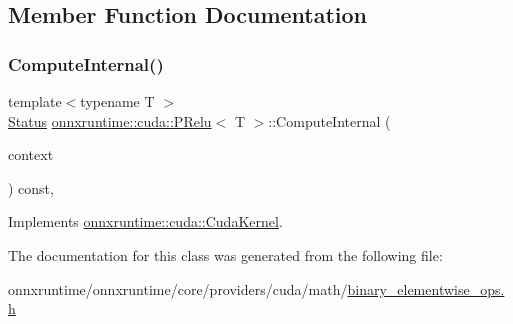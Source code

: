 \subsection{Member Function Documentation}
\mbox{\label{classonnxruntime_1_1cuda_1_1PRelu_ac22e96f904703a1dd13dc6748a67f2ae}} 
\subsubsection{\texorpdfstring{Compute\+Internal()}{ComputeInternal()}}
{\footnotesize\ttfamily template$<$typename T $>$ \\
\mbox{\hyperlink{classonnxruntime_1_1common_1_1Status}{Status}} \mbox{\hyperlink{classonnxruntime_1_1cuda_1_1PRelu}{onnxruntime\+::cuda\+::\+P\+Relu}}$<$ T $>$\+::Compute\+Internal (\begin{DoxyParamCaption}\item[{\mbox{\hyperlink{classonnxruntime_1_1OpKernelContext}{Op\+Kernel\+Context}} $\ast$}]{context }\end{DoxyParamCaption}) const\hspace{0.3cm}{\ttfamily [override]}, {\ttfamily [virtual]}}



Implements \mbox{\hyperlink{classonnxruntime_1_1cuda_1_1CudaKernel_aca7af04ae448017d6023d30bba231ebb}{onnxruntime\+::cuda\+::\+Cuda\+Kernel}}.



The documentation for this class was generated from the following file\+:\begin{DoxyCompactItemize}
\item 
onnxruntime/onnxruntime/core/providers/cuda/math/\mbox{\hyperlink{binary__elementwise__ops_8h}{binary\+\_\+elementwise\+\_\+ops.\+h}}\end{DoxyCompactItemize}
